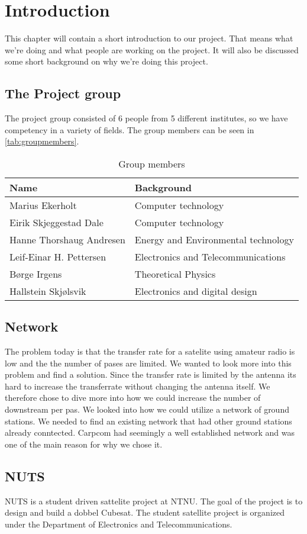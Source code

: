 \chapter{Introduction}
\label{chap:introduction}
This chapter will contain a short introduction to our project. That means what we're doing and what people are working on the project. It will also be discussed some short background on why we're doing this project.
\section{The Project group}
The project group consisted of 6 people from 5 different institutes, so we have competency in a variety of fields. The group members can be seen in \autoref{tab:groupmembers}.

\begin{table}
	\begin{center}
		\begin{tabular}{|l|l|}   
			\hline      
			\bf{Name} & \bf{Background} \\ 
			\hline
			Marius Ekerholt & Computer technology\\     
			\hline
			Eirik Skjeggestad Dale & Computer technology\\     
			\hline
			Hanne Thorshaug Andresen & Energy and Environmental technology\\     
			\hline
			Leif-Einar H. Pettersen & Electronics and Telecommunications\\     
			\hline
			Børge Irgens & Theoretical Physics\\     
			\hline
			Hallstein Skjølsvik & Electronics and digital design\\     
			\hline
		 \end{tabular}
	\end{center}
	\caption{Group members}
	\label{tab:groupmembers}
\end{table}

\section{Network}

The problem today is that the transfer rate for a satelite using amateur radio is low and the the number of pases are limited. We wanted to look more into this problem and find a solution. Since the transfer rate is limited by the antenna its hard to increase the transferrate without changing the antenna itself. We therefore chose to dive more into how we could increase the number of downstream per pas. We looked into how we could utilize a network of ground stations. We needed to find an existing network that had other ground stations already conntected. Carpcom had seemingly a well established network and was one of the main reason for why we chose it.

\section{NUTS}

NUTS is a student driven sattelite project at NTNU. The goal of the project is to design and build a dobbel Cubesat. The student satellite project is organized under the  Department of Electronics and Telecommunications. 